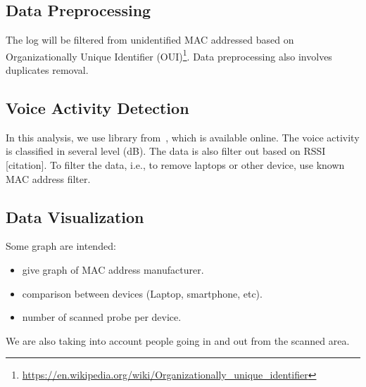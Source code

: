 \documentclass{article}
\begin{document}
\subsection{Data Preprocessing} %
\label{sub:data_preprocessing}
The log will be filtered from unidentified MAC addressed based on Organizationally Unique Identifier (OUI)\footnote{\url{https://en.wikipedia.org/wiki/Organizationally_unique_identifier}}. Data preprocessing also involves duplicates removal.

\subsection{Voice Activity Detection} %
\label{sub:voice_activity_detection}
In this analysis, we use library from~\cite{thesis070,thesis067}, which is available online. The voice activity is classified in several level (dB). The data is also filter out based on RSSI [citation]. To filter the data, i.e., to remove laptops or other device, use known MAC address filter.

\subsection{Data Visualization} %
\label{sub:data_visualization}
Some graph are intended:
\begin{itemize}
	\item give graph of MAC address manufacturer.
	\item comparison between devices (Laptop, smartphone, etc).
	\item number of scanned probe per device.
\end{itemize}
We are also taking into account people going in and out from the scanned area.



{}

\end{document}
